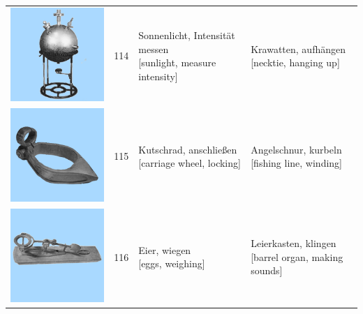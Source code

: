 \documentclass[
  english,
  doc,12pt,twoside,floatsintext]{apa7}
\begin{document}
\begin{center}
\begin{ThreePartTable}
{\begin{longtable}{llll}
\includegraphics[valign=c, scale=0.23]{../materials/unfamiliar/114.png} & 114 & \makecell[l]{Sonnenlicht, Intensität messen\\{[sunlight, measure intensity]}} & \makecell[l]{Krawatten, aufhängen\\{[necktie, hanging up]}}\\
\includegraphics[valign=c, scale=0.23]{../materials/unfamiliar/115.png} & 115 & \makecell[l]{Kutschrad, anschließen\\{[carriage wheel, locking]}} & \makecell[l]{Angelschnur, kurbeln\\{[fishing line, winding]}}\\
\includegraphics[valign=c, scale=0.23]{../materials/unfamiliar/116.png} & 116 & \makecell[l]{Eier, wiegen\\{[eggs, weighing]}} & \makecell[l]{Leierkasten, klingen\\{[barrel organ, making sounds]}}\\

\end{longtable}}
\end{ThreePartTable}
\end{center}
\end{document}
